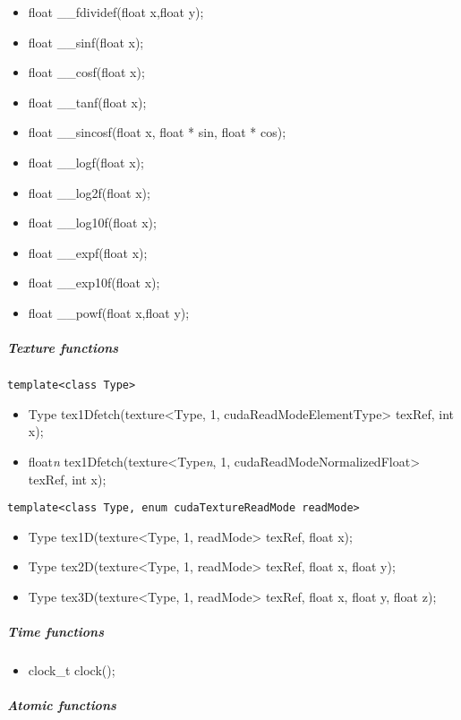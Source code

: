 \begin{itemize}
	\item float \_\_fdividef(float x,float y);
	\item float \_\_sinf(float x);
	\item float \_\_cosf(float x);
	\item float \_\_tanf(float x);
	\item float \_\_sincosf(float x, float * sin, float * cos);
	\item float \_\_logf(float x);
	\item float \_\_log2f(float x);
	\item float \_\_log10f(float x);
	\item float \_\_expf(float x);
	\item float \_\_exp10f(float x);
	\item float \_\_powf(float x,float y);
\end{itemize}

					\subparagraph{Texture functions}
					
\begin{verbatim}template<class Type>\end{verbatim}
\begin{itemize}
	\item Type tex1Dfetch(texture<Type, 1, cudaReadModeElementType> texRef, int x);
	\item float\emph{n} tex1Dfetch(texture<Type\emph{n}, 1, cudaReadModeNormalizedFloat> texRef, int x);
\end{itemize}

\begin{verbatim}template<class Type, enum cudaTextureReadMode readMode>\end{verbatim}
\begin{itemize}
	\item Type tex1D(texture<Type, 1, readMode> texRef, float x);
	\item Type tex2D(texture<Type, 1, readMode> texRef, float x, float y);
	\item Type tex3D(texture<Type, 1, readMode> texRef, float x, float y, float z);
\end{itemize}

					\subparagraph{Time functions}

\begin{itemize}
	\item clock\_t clock();
\end{itemize}

					\subparagraph{Atomic functions}

